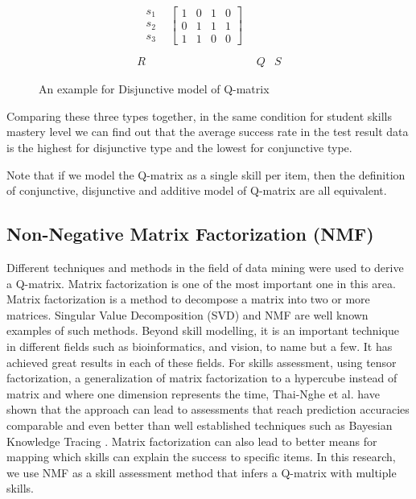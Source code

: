 \begin{figure}
\begin{footnotesize}
\[\begin{array}{ccc}
\begin{array}{cc}
\begin{array}{c}
s_{1}\\
s_{2}\\
s_{3}
\end{array} & \left[\begin{array}{cccc}
1 & 0 & 1 & 0\\
0 & 1 & 1 & 1\\
1 & 1 & 0 & 0
\end{array}\right]
\end{array}\\
\\
R & Q & S
\end{array}
\]
 \end{footnotesize} \caption{An example for Disjunctive model of Q-matrix}


\label{fig1Dis} 
\end{figure}

Comparing these three types together, in the same condition for student skills mastery level we can find out that the average success rate in the test result data is the highest for disjunctive type and the lowest for conjunctive type. 

Note that if we model the Q-matrix as a single skill per item, then the definition of conjunctive, disjunctive and additive model of Q-matrix are all equivalent.


\subsection{Non-Negative Matrix Factorization (\ac{NMF})}
\label{NMF_MODEL_ASSESS}

Different techniques and methods in the field of data mining were used to derive a Q-matrix. Matrix factorization is one of the most important one in this area. Matrix factorization is a method to decompose a matrix into two or more matrices. Singular Value Decomposition (SVD) and NMF are well known examples of such methods. Beyond skill modelling, it is an important technique in different fields such as bioinformatics, and vision, to name but a few. It has achieved great results in each of these fields. For skills assessment, using tensor factorization, a generalization of matrix factorization to a hypercube instead of matrix and where one dimension represents the time, Thai-Nghe et al. \citep{Nguyen2011} have shown that the approach can lead to assessments that reach prediction accuracies comparable and even better than well established techniques such as Bayesian Knowledge Tracing \citep{corbett:umuai:1995}. Matrix factorization can also lead to better means for mapping which skills can explain the success to specific items. In this research, we use NMF as a skill assessment method that infers a Q-matrix with multiple skills.

